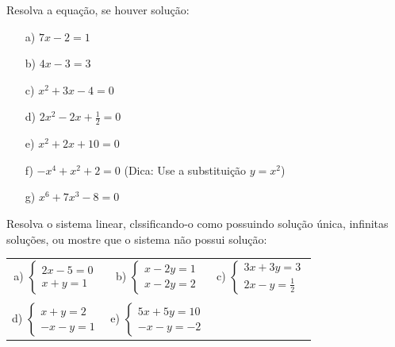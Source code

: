  Resolva a equação, se houver solução:

\begin{itemize}

\item[a)]$7x-2=1$
\item[b)]$4x-3=3$
\item[c)]$x^2+3x-4=0$
\item[d)]$2x^2-2x+\frac{1}{2}=0$
\item[e)]$x^2+2x+10=0$
\item[f)]$-x^4+x^2+2=0$ (Dica: Use a substituição $y=x^2$)
\item[g)] $x^6+7x^3-8=0$

\end{itemize}

 Resolva o sistema linear, clssificando-o como possuindo solução única, infinitas soluções,
 ou mostre que o sistema não possui solução:

\begin{tabular}{ccc}
a) $\left\{\begin{array}{c}
2x-5=0\\
x+y=1
\end{array}\right.$
&
\hspace{1cm} b) $\left\{\begin{array}{c}
x-2y=1\\
x-2y=2
\end{array}\right.
$
&
\hspace{1cm} c) $\left\{\begin{array}{c}
3x+3y=3\\
2x-y=\frac{1}{2}
\end{array}\right.
$ \\
\\ d) $\left\{\begin{array}{c}
x+y=2\\
-x-y=1
\end{array}\right.
$
&
\hspace{1cm} e) $\left\{\begin{array}{c}
5x+5y=10\\
-x-y=-2
\end{array}\right.
$
\end{tabular}
